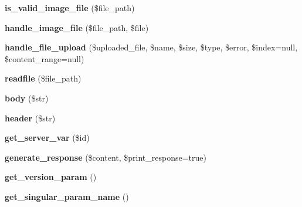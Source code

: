 \begin{DoxyCompactItemize}
\item 
\hypertarget{class_upload_handler_a36ce54fd9f7251e3a0c0173bf5064f4f}{{\bfseries is\-\_\-valid\-\_\-image\-\_\-file} (\$file\-\_\-path)}\label{class_upload_handler_a36ce54fd9f7251e3a0c0173bf5064f4f}

\item 
\hypertarget{class_upload_handler_ac636e3e6ba585b1f68f419f3ffae9f4d}{{\bfseries handle\-\_\-image\-\_\-file} (\$file\-\_\-path, \$file)}\label{class_upload_handler_ac636e3e6ba585b1f68f419f3ffae9f4d}

\item 
\hypertarget{class_upload_handler_ad03bbc690543eac3e157c3b015d088a4}{{\bfseries handle\-\_\-file\-\_\-upload} (\$uploaded\-\_\-file, \$name, \$size, \$type, \$error, \$index=null, \$content\-\_\-range=null)}\label{class_upload_handler_ad03bbc690543eac3e157c3b015d088a4}

\item 
\hypertarget{class_upload_handler_aea88401817b9fb816c494323b285604a}{{\bfseries readfile} (\$file\-\_\-path)}\label{class_upload_handler_aea88401817b9fb816c494323b285604a}

\item 
\hypertarget{class_upload_handler_ae0c595db98ffd64843b71686f25179c5}{{\bfseries body} (\$str)}\label{class_upload_handler_ae0c595db98ffd64843b71686f25179c5}

\item 
\hypertarget{class_upload_handler_a3af02a257dae588ef2d306d5b936d7cc}{{\bfseries header} (\$str)}\label{class_upload_handler_a3af02a257dae588ef2d306d5b936d7cc}

\item 
\hypertarget{class_upload_handler_ae346ec8ea9b4ccbd606b161abe8fd49e}{{\bfseries get\-\_\-server\-\_\-var} (\$id)}\label{class_upload_handler_ae346ec8ea9b4ccbd606b161abe8fd49e}

\item 
\hypertarget{class_upload_handler_a137517f0cfb55dd68c4f868b4caf82f5}{{\bfseries generate\-\_\-response} (\$content, \$print\-\_\-response=true)}\label{class_upload_handler_a137517f0cfb55dd68c4f868b4caf82f5}

\item 
\hypertarget{class_upload_handler_a787019fce1133b3f28221c29d996b511}{{\bfseries get\-\_\-version\-\_\-param} ()}\label{class_upload_handler_a787019fce1133b3f28221c29d996b511}

\item 
\hypertarget{class_upload_handler_aadfab69e37378c1954bd569b10a4af02}{{\bfseries get\-\_\-singular\-\_\-param\-\_\-name} ()}\label{class_upload_handler_aadfab69e37378c1954bd569b10a4af02}


\end{DoxyCompactItemize}
